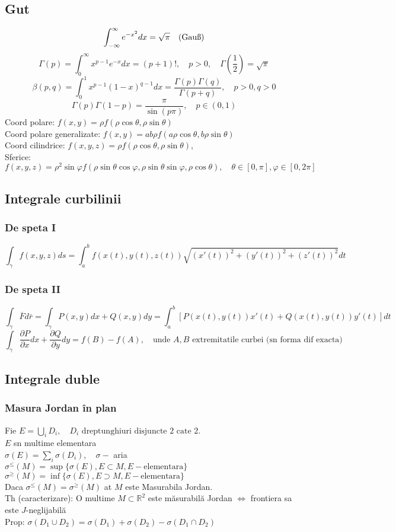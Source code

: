 \documentclass{article}
\newcommand{\parti}[2]{\frac{\partial #1}{ \partial #2}}
\newcommand*{\R}{\mathbb{R}}
\begin{document}
\subsection*{Gut}
\[ \int_{-\infty}^{\infty}e^{-x^2}dx = \sqrt{\pi} \text{\quad(Gauß)} \]
\[ \Gamma(p) = \int_0^{\infty} x^{p-1}e^{-x}dx = (p+1)!, \quad p > 0, \quad \Gamma\left(\frac{1}{2}\right) = \sqrt{\pi}  \]
\[ \beta(p, q) = \int_0^{1} x^{p-1}(1-x)^{q-1}dx = \frac{\Gamma(p)\Gamma(q)}{\Gamma(p+q)}, \quad p > 0, q > 0 \]
\[ \Gamma(p)\Gamma(1-p)= \frac{\pi}{\sin(p\pi)}, \quad p \in (0, 1) \]
Coord polare: $f(x,y) = \rho f(\rho \cos \theta, \rho \sin\theta)$ \\
Coord polare generalizate: $f(x,y) = ab\rho f(a\rho\cos\theta, b\rho\sin\theta) $\\
Coord cilindrice: $f(x, y, z) = \rho f(\rho\cos\theta, \rho\sin\theta)$, \\
Sferice: $f(x, y,z) = \rho^2\sin\varphi f(\rho \sin\theta\cos\varphi, \rho\sin\theta\sin\varphi, \rho\cos\theta),\quad \theta \in [0, \pi], \varphi \in[0, 2\pi]$
\subsection*{Integrale curbilinii}
\subsubsection*{De speta I}
\[ \int_{\gamma} f(x, y, z)ds = \int_a^bf(x(t), y(t), z(t)) \sqrt{(x'(t))^2+(y'(t))^2+(z'(t))^2} dt \]
\subsubsection*{De speta II}
\[ \int_{\gamma}\overline{F}d\bar{r} = \int_{\gamma} P(x,y) dx+ Q(x,y)dy = \int_a^b \left[P(x(t), y(t))x'(t) + Q(x(t), y(t)) y'(t) \right]dt \]
\[ \int_{\gamma} \parti{P}{x}dx+\parti{Q}{y}dy = f(B)- f(A), \quad \text{unde $A, B$ extremitatile curbei (sn forma dif exacta) } \]
\subsection*{Integrale duble}
\subsubsection*{Masura Jordan în plan}
Fie $E = \bigcup_i D_i, \quad D_i \text{ dreptunghiuri disjuncte 2 cate 2}$.\\
$E$ sn multime elementara\\
$\sigma(E) = \sum_i \sigma(D_i), \quad \sigma - $ aria\\
$\sigma^{\le}(M)=\sup\{\sigma(E), E \subset M, E -\text{elementara} \}$\\
$\sigma^{\ge}(M)=\inf\{\sigma(E), E \supset M, E -\text{elementara} \}$\\
Daca $\sigma^{\le}(M)=\sigma^{\ge}(M) $ at $M$ este Masurabila Jordan.\\
Th (caracterizare): O multime $M \subset \R^2$ este măsurabilă Jordan $\iff$ frontiera sa este $J$-neglijabilă\\
Prop: $\sigma(D_1\cup D_2) = \sigma(D_1) + \sigma(D_2) - \sigma(D_1\cap D_2)$
\end{document}
